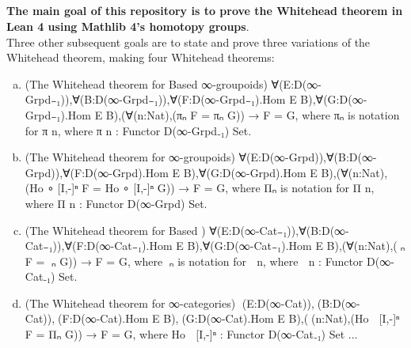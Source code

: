 \documentclass{book}
\theoremstyle{definition}
\newcounter{pcounter}
\newcounter{sectioncount}
\newcounter{subsectioncount}
\renewcommand{\section}[1]{\newpage\ \\ \ \\ \begin{center} \scalebox{1.5}{\texttt{\thesectioncount . #1}} \stepcounter{sectioncount} \setcounter{subsectioncount}{1} \end{center} \begin{center} \ \\ \ \\ \thispagestyle{empty} \end{center}}
\begin{document}
\section{Notes}

{\bf The main goal of this repository is to prove the Whitehead theorem in Lean 4 using Mathlib 4's homotopy groups}.\\

Three other subsequent goals are to state and prove three variations of the Whitehead theorem, making four Whitehead theorems:\\

\begin{enumerate}[(a)]
\item (The Whitehead theorem for Based ∞-groupoids) ∀(E:D(∞-Grpd₋₁)),∀(B:D(∞-Grpd₋₁)),∀(F:D(∞-Grpd₋₁).Hom E B),∀(G:D(∞-Grpd₋₁).Hom E B),(∀(n:Nat),(πₙ F = πₙ G)) → F = G, where πₙ is notation for π n, where π n : Functor D(∞-Grpd₋₁) Set.
\item (The Whitehead theorem for ∞-groupoids) ∀(E:D(∞-Grpd)),∀(B:D(∞-Grpd)),∀(F:D(∞-Grpd).Hom E B),∀(G:D(∞-Grpd).Hom E B),(∀(n:Nat),(Ho ∘ [I,-]ⁿ F = Ho ∘ [I,-]ⁿ  G)) → F = G, where Πₙ is notation for Π n, where Π n : Functor D(∞-Grpd) Set.
\item (The Whitehead theorem for Based ) ∀(E:D(∞-Cat₋₁)),∀(B:D(∞-Cat₋₁)),∀(F:D(∞-Cat₋₁).Hom E B),∀(G:D(∞-Cat₋₁).Hom E B),(∀(n:Nat),(π⃗ₙ F = π⃗ₙ G)) → F = G, where π⃗ₙ is notation for π⃗ n, where π⃗ n : Functor D(∞-Cat₋₁) Set.
\item (The Whitehead theorem for ∞-categories) ∀(E:D(∞-Cat)),∀(B:D(∞-Cat)),∀(F:D(∞-Cat).Hom E B),∀(G:D(∞-Cat).Hom E B),(∀(n:Nat),(Ho ∘ [I⃗,-]ⁿ F = Π⃗ₙ G)) → F = G, where Ho ∘ [I⃗,-]ⁿ : Functor D(∞-Cat₋₁) Set ... 
\end{enumerate}
\end{document}
